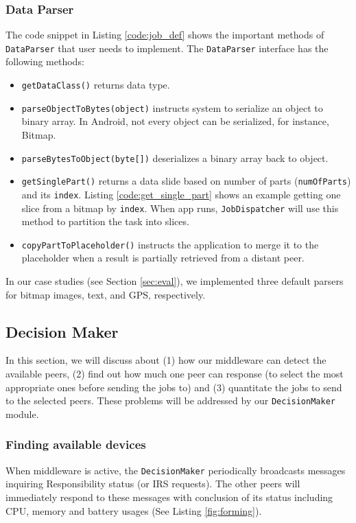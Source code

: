 \documentclass{sig-alternate}[10pt]
\begin{document}
\subsubsection{Data Parser} \label{data_parser}
The code snippet in Listing \ref{code:job_def} shows the important methods of \texttt{DataParser} that user needs to implement. The \texttt{DataParser} interface has the following methods:
\begin{itemize}
	\item \texttt{getDataClass()} returns data type.
	\item \texttt{parseObjectToBytes(object)} instructs system to serialize an object to binary array. In Android, not every object can be serialized, for instance, Bitmap.  
	\item \texttt{parseBytesToObject(byte[])} deserializes a binary array back to object.
	\item \texttt{getSinglePart()} returns a data slide based on number of parts (\texttt{numOfParts}) and its \texttt{index}. Listing \ref{code:get_single_part} shows an example getting one slice from a bitmap by \texttt{index}. When app runs, \texttt{JobDispatcher} will use this method to partition the task into slices.
	\item \texttt{copyPartToPlaceholder()} instructs the application to merge it to the placeholder when a result is partially retrieved from a distant peer.
\end{itemize}

In our case studies (see Section \ref{sec:eval}), we implemented three default parsers for bitmap images, text, and GPS, respectively. 

\subsection{Decision Maker} \label{scheduling}

In this section, we will discuss about (1) how our middleware can detect the available peers, (2) find out how much one peer can response (to select the most appropriate ones before sending the jobs to) and (3) quantitate the jobs to send to the selected peers. These problems will be addressed by our \texttt{DecisionMaker} module.

\subsubsection{Finding available devices}\label{ss_dfp}

When middleware is active, the \texttt{DecisionMaker} periodically broadcasts messages inquiring Responsibility status (or IRS requests). The other peers will immediately respond to these messages with conclusion of its status including CPU, memory and battery usages (See Listing \ref{fig:forming}).
\end{document}
